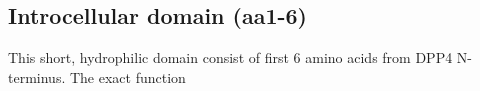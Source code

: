 \subsection{Introcellular domain (aa1-6)}

This short, hydrophilic domain consist of first 6 amino acids from DPP4 N-terminus. The exact function